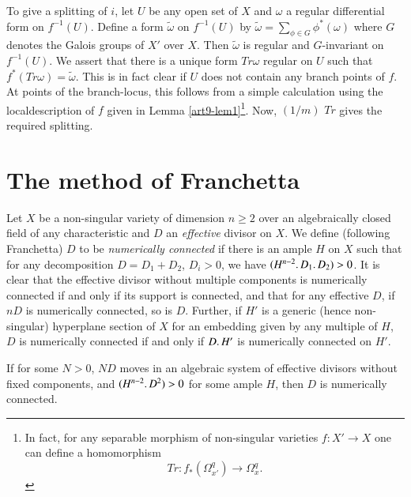 To give a splitting of $i$, let $U$ be any open set of $X$ and $\omega$ a regular differential form on $f^{-1} (U)$. Define a form $\tilde{\omega}$ on $f^{-1} (U)$ by $\tilde{\omega} = \sum\limits_{\phi \in G} \phi^* (\omega)$ where $G$ denotes the Galois groups of $X'$ over $X$. Then $\tilde{\omega}$ is regular and $G$-invariant on $f^{-1} (U)$. We assert that there is a unique form $Tr\omega$ regular on $U$ such that $f^* (Tr\omega) = \tilde{\omega}$. This is in fact clear if $U$ does not contain any branch points of $f$. At points of the branch-locus, this follows from a simple calculation using the local\pageoriginale description of $f$ given in Lemma \ref{art9-lem1}\footnote[2]{In fact, for any separable morphism of non-singular varieties $f: X' \to X$ one can define a homomorphism
$$
Tr : f_* (\Omega^q_{x'}) \to \Omega^q_x.
$$}. Now, $(1/m)$ $Tr$ gives the required splitting.

\section{The method of Franchetta}\label{art9-sec3}
Let $X$ be a non-singular variety of dimension $n\ge2$ over an algebraically closed field {of any characteristic} and $D$ an {\em effective} divisor on $X$. We define (following Franchetta) $D$ to be {\em numerically connected} if there is an ample $H$ on $X$ such that for any decomposition $D = D_1 + D_2$, $D_i>0$, we have $(H^{n-2} \ldotp D_1 \ldotp D_2)>0$. It is clear that the effective divisor without multiple components is numerically connected if and only if its support is connected, and that for any effective $D$, if $nD$ is numerically connected, so is $D$. Further, if $H'$ is a generic (hence non-singular) hyperplane section of $X$ for an embedding given by any multiple of $H$, $D$ is numerically connected if and only if $D\ldotp H'$ is numerically connected on $H'$.

\begin{lem}\label{art9-lem2}
If for some $N>0$, $ND$ moves in an algebraic system of effective divisors without fixed components, and $(H^{n-2} \ldotp D^2)>0$ for some ample $H$, then $D$ is numerically connected.
\end{lem}

